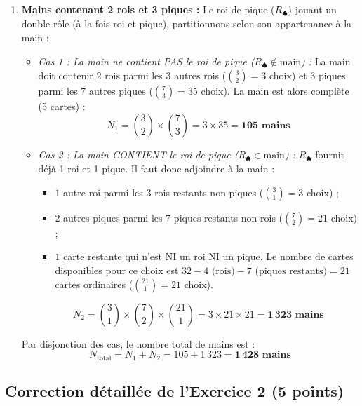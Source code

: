 \documentclass[11pt,a4paper]{article}
\begin{document}
\begin{correctionbox}
\begin{enumerate}
    \item \textbf{Mains contenant 2 rois et 3 piques :}
    Le roi de pique ($R_\spadesuit$) jouant un double rôle (à la fois roi et pique), partitionnons selon son appartenance à la main :
    \begin{itemize}[label=$\bullet$]
        \item \emph{Cas 1 : La main ne contient PAS le roi de pique ($R_\spadesuit \notin \text{main}$) :}
        La main doit contenir 2 rois parmi les 3 autres rois ($\binom{3}{2} = 3$ choix) et 3 piques parmi les 7 autres piques ($\binom{7}{3} = 35$ choix). La main est alors complète (5 cartes) :
        \[
        N_1 = \binom{3}{2} \times \binom{7}{3} = 3 \times 35 = \mathbf{105\text{ mains}}
        \]
        \item \emph{Cas 2 : La main CONTIENT le roi de pique ($R_\spadesuit \in \text{main}$) :}
        $R_\spadesuit$ fournit déjà 1 roi et 1 pique. Il faut donc adjoindre à la main :
        \begin{itemize}
            \item $1$ autre roi parmi les 3 rois restants non-piques ($\binom{3}{1} = 3$ choix) ;
            \item $2$ autres piques parmi les 7 piques restants non-rois ($\binom{7}{2} = 21$ choix) ;
            \item $1$ carte restante qui n'est NI un roi NI un pique. Le nombre de cartes disponibles pour ce choix est $32 - 4 \text{ (rois)} - 7 \text{ (piques restants)} = 21$ cartes ordinaires ($\binom{21}{1} = 21$ choix).
        \end{itemize}
        \[
        N_2 = \binom{3}{1} \times \binom{7}{2} \times \binom{21}{1} = 3 \times 21 \times 21 = \mathbf{1\,323\text{ mains}}
        \]
    \end{itemize}
    Par disjonction des cas, le nombre total de mains est :
    \[
    N_{\text{total}} = N_1 + N_2 = 105 + 1\,323 = \mathbf{1\,428\text{ mains}}
    \]
\end{enumerate}
\end{correctionbox}

\vspace{0.4cm}

\subsection*{Correction détaillée de l'Exercice 2 \hfill (5 points)}
\end{document}
